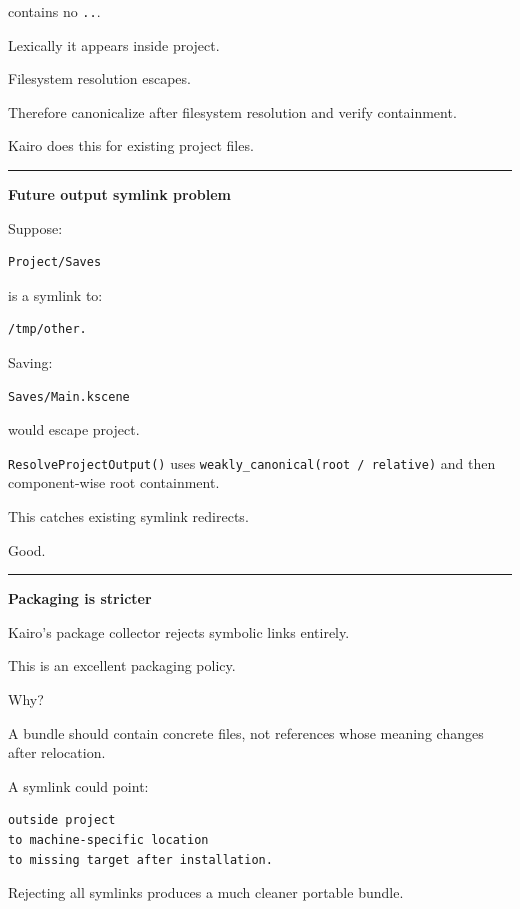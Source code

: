 contains no \texttt{..}.

Lexically it appears inside project.

Filesystem resolution escapes.

Therefore canonicalize after filesystem resolution and verify containment.

Kairo does this for existing project files.

\begin{center}\rule{0.5\linewidth}{0.5pt}\end{center}

\textbf{Future output symlink problem}

Suppose:

\begin{verbatim}
Project/Saves
\end{verbatim}

is a symlink to:

\begin{verbatim}
/tmp/other.
\end{verbatim}

Saving:

\begin{verbatim}
Saves/Main.kscene
\end{verbatim}

would escape project.

\texttt{ResolveProjectOutput()} uses \texttt{weakly\_canonical(root\ /\ relative)} and then component-wise root containment.

This catches existing symlink redirects.

Good.

\begin{center}\rule{0.5\linewidth}{0.5pt}\end{center}

\textbf{Packaging is stricter}

Kairo's package collector rejects symbolic links entirely.

This is an excellent packaging policy.

Why?

A bundle should contain concrete files, not references whose meaning changes after relocation.

A symlink could point:

\begin{verbatim}
outside project
to machine-specific location
to missing target after installation.
\end{verbatim}

Rejecting all symlinks produces a much cleaner portable bundle.

